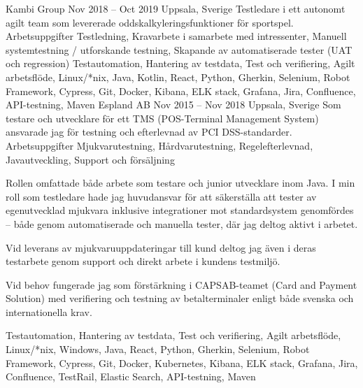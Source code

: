 \documentclass{sobCV}[2015/09/08]
\begin{document}
   
   

   {Kambi Group}
    {Nov 2018 -- Oct 2019}
   {Uppsala, Sverige}{
       Testledare i ett autonomt agilt team som levererade oddskalkyleringsfunktioner för sportspel.
   }
   {Arbetsuppgifter}{
       Testledning,
       Kravarbete i samarbete med intressenter,
       Manuell systemtestning / utforskande testning,
       Skapande av automatiserade tester (UAT och regression)
 }{
 }{
       Testautomation,
       Hantering av testdata,
       Test och verifiering,
       Agilt arbetsflöde, 
       Linux/*nix, 
       Java, 
       Kotlin, 
       React, 
       Python, 
       Gherkin, 
       Selenium, 
       Robot Framework,
       Cypress, 
       Git, 
       Docker, 
       Kibana, 
       ELK stack, 
       Grafana, 
       Jira, 
       Confluence, 
       API-testning, 
       Maven 
}
   {Espland AB}
    {Nov 2015 -- Nov 2018}
   {Uppsala, Sverige}{
       Som testare och utvecklare för ett TMS (POS-Terminal Management System) ansvarade jag för testning och efterlevnad av PCI DSS-standarder.
   }
   {Arbetsuppgifter}{
       Mjukvarutestning,
       Hårdvarutestning,
       Regelefterlevnad, 
       Javautveckling,
       Support och försäljning
 }{
      {
          Rollen omfattade både arbete som testare och junior utvecklare inom Java. I min roll som testledare hade jag huvudansvar för att säkerställa att tester av egenutvecklad mjukvara inklusive integrationer mot standardsystem genomfördes – både genom automatiserade och manuella tester, där jag deltog aktivt i arbetet.

          Vid leverans av mjukvaruuppdateringar till kund deltog jag även i deras testarbete genom support och direkt arbete i kundens testmiljö.

          Vid behov fungerade jag som förstärkning i CAPSAB-teamet (Card and Payment Solution) med verifiering och testning av betalterminaler enligt både svenska och internationella krav.
     }
 }{
       Testautomation,
       Hantering av testdata,
       Test och verifiering,
       Agilt arbetsflöde, 
       Linux/*nix, 
       Windows, 
       Java, 
       React, 
       Python, 
       Gherkin, 
       Selenium, 
       Robot Framework,
       Cypress, 
       Git, 
       Docker, 
       Kubernetes, 
       Kibana, 
       ELK stack, 
       Grafana, 
       Jira, 
       Confluence, 
       TestRail, 
       Elastic Search, 
       API-testning, 
       Maven 
}
\end{document}
